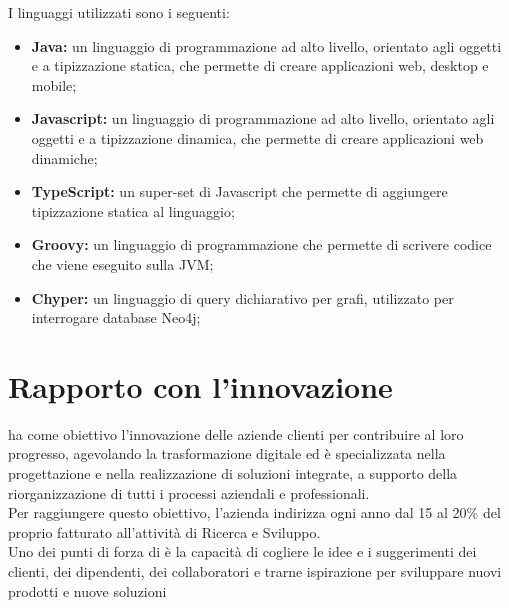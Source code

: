 I linguaggi utilizzati sono i seguenti:\\

\begin{itemize}
  \item \textbf{Java:} un linguaggio di programmazione ad alto livello, orientato agli oggetti e a tipizzazione statica, che permette di creare applicazioni web, desktop e mobile;
  \item \textbf{Javascript:} un linguaggio di programmazione ad alto livello, orientato agli oggetti e a tipizzazione dinamica, che permette di creare applicazioni web dinamiche;
  \item \textbf{TypeScript:} un super-set di Javascript che permette di aggiungere tipizzazione statica al linguaggio;
  \item \textbf{Groovy:} un linguaggio di programmazione che permette di scrivere codice che viene eseguito sulla \gls{JVM};
  \item \textbf{Chyper:} un linguaggio di query dichiarativo per grafi, utilizzato per interrogare database \gls{Neo4j};
\end{itemize}
\newpage
\section{Rapporto con l'innovazione}

{\azienda} ha come obiettivo l’innovazione delle aziende clienti per contribuire al loro progresso, 
agevolando la trasformazione digitale ed è specializzata nella progettazione e nella realizzazione di soluzioni integrate, 
a supporto della riorganizzazione di tutti i processi aziendali e professionali.\\
Per raggiungere questo obiettivo, l'azienda indirizza ogni anno dal 15 al 20\% del proprio fatturato all’attività di Ricerca e Sviluppo.\\
Uno dei punti di forza di {\azienda} è la capacità di cogliere le idee e i suggerimenti dei clienti, dei dipendenti, dei collaboratori e trarne ispirazione per sviluppare nuovi prodotti e nuove soluzioni